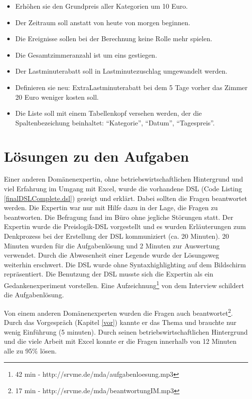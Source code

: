 \documentclass[11pt,english,ngerman, headsepline]{scrreprt}
\begin{document}
\begin{itemize} 
\item Erhöhen sie den Grundpreis aller Kategorien um 10 Euro. 
\item Der Zeitraum soll anstatt von heute von morgen beginnen.
\item Die Ereignisse sollen bei der Berechnung keine Rolle mehr spielen.
\item Die Gesamtzimmeranzahl ist um eins gestiegen.
\item Der Lastminuterabatt soll in Lastminutezuschlag umgewandelt werden.
\item Definieren sie neu: ExtraLastminuterabatt bei dem 5 Tage vorher
das Zimmer 20 Euro weniger kosten soll. 
\item Die Liste soll mit einem Tabellenkopf versehen werden, der die
Spaltenbezeichung beinhaltet: ``Kategorie'', ``Datum'', ``Tagespreis''. 
\end{itemize}

\section{Lösungen zu den Aufgaben}

Einer anderen Domänenexpertin, ohne betriebswirtschaftlichen Hintergrund und
viel Erfahrung im Umgang mit Excel, wurde die vorhandene DSL (Code Listing
\ref{finalDSLComplete.dsl}) gezeigt und erklärt.
Dabei sollten die Fragen beantwortet werden. Die Expertin war nur mit Hilfe dazu
in der Lage, die Fragen zu beantworten.
Die Befragung fand im Büro ohne jegliche Störungen statt. Der Expertin wurde die
Preislogik-DSL vorgestellt und es wurden Erläuterungen zum Denkprozess bei der
Erstellung der DSL kommuniziert (ca. 20 Minuten). 20 Minuten wurden für die
Aufgabenlösung und 2 Minuten zur Auswertung verwendet. Durch die Abwesenheit
einer Legende wurde der Lösungsweg weiterhin erschwert. Die DSL wurde ohne
Syntaxhighlighting auf dem Bildschirm repräsentiert. Die Benutzung
der DSL musste sich die Expertin als ein Gedankenexperiment
vorstellen.
Eine Aufzeichnung\footnote{42 min - http://srvme.de/mda/aufgabenloesung.mp3} von
dem Interview schildert die Aufgabenlösung.

Von einem anderen Domänenexperten wurden die Fragen auch beantwortet\footnote{17
min - http://srvme.de/mda/beantwortungIM.mp3}.
Durch das Vorgespräch (Kapitel \ref{vor}) kannte er das Thema und brauchte nur
wenig Einführung (5 minuten). Durch seinen betriebswirtschaftlichen Hintergrund
und die viele Arbeit mit Excel konnte er die Fragen innerhalb von 12 Minuten alle zu 95\% lösen.
\end{document}

